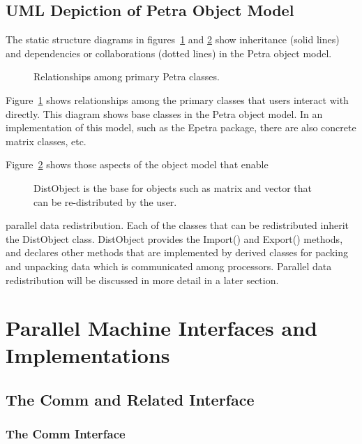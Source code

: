 \documentclass[10pt,relax]{PetraObjectModel}
\begin{document}
\subsection{UML Depiction of Petra Object Model}

The static structure diagrams in figures~\ref{matvecmap} and \ref{distobj}
show inheritance (solid lines) and dependencies or collaborations (dotted
lines) in the Petra object model.
\begin{figure}[ht]
\begin{center}
\caption{Relationships among primary Petra classes.}
\label{matvecmap}
\end{center}
\end{figure}
Figure~\ref{matvecmap} shows relationships among the primary classes that users
interact with directly.  This
diagram shows base classes in the Petra object model. In an implementation of
this model, such as the Epetra package, there are also concrete matrix classes,
etc.

Figure~\ref{distobj} shows those aspects of the object model that enable
\begin{figure}[ht]
\begin{center}
\caption{DistObject is the base for objects such as matrix and vector that can be re-distributed by the user.}
\label{distobj}
\end{center}
\end{figure}
parallel data redistribution. Each of the classes that can be redistributed
inherit the DistObject class. DistObject provides the Import() and Export()
methods, and declares other methods that are implemented by derived classes for
packing and unpacking data which is communicated among processors. Parallel
data redistribution will be discussed in more detail in a later section.

\section{Parallel Machine Interfaces and Implementations}

\subsection{The Comm and Related Interface}

\subsubsection{The Comm Interface}
\end{document}
